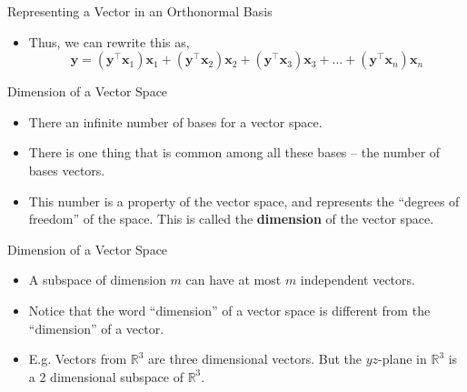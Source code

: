 \documentclass[aspectratio=169]{beamer}
\let\olditem\item
\renewcommand{\item}{\setlength{\itemsep}{\fill}\olditem}
\begin{document}
  \begin{frame}[t]{Representing a Vector in an Orthonormal Basis}
  \begin{itemize}
  \item Thus, we can rewrite this as,
  \[ \mathbf{y} = \left(\mathbf{y}^\top\mathbf{x}_1\right)\mathbf{x}_1 + \left(\mathbf{y}^\top\mathbf{x}_2\right)\mathbf{x}_2 + \left(\mathbf{y}^\top\mathbf{x}_3\right)\mathbf{x}_3 + \ldots + \left(\mathbf{y}^\top\mathbf{x}_n\right)\mathbf{x}_n \]
  \end{itemize}
  \begin{center}
  \end{center}
  \end{frame}
  
  
  \begin{frame}[t]{Dimension of a Vector Space}
  \begin{itemize}
  \item There an infinite number of bases for a vector space.
  \item There is one thing that is common among all these bases -- the number of bases vectors.
  \item This number is a property of the vector space, and represents the ``degrees of freedom'' of the space. This is called the \textbf{dimension} of the vector space.
  \end{itemize}
  \end{frame}
  
  
  \begin{frame}[t]{Dimension of a Vector Space}
  \begin{itemize}
  \item A subspace of dimension $m$ can have at most $m$ independent vectors.
  \item Notice that the word ``dimension'' of a vector space is different from the ``dimension'' of a vector.
  \item E.g. Vectors from $\mathbb{R}^3$ are three dimensional vectors. But the $yz$-plane in $\mathbb{R}^3$ is a 2 dimensional subspace of $\mathbb{R}^3$.
  \end{itemize}
  \end{frame}
  
\end{document}

